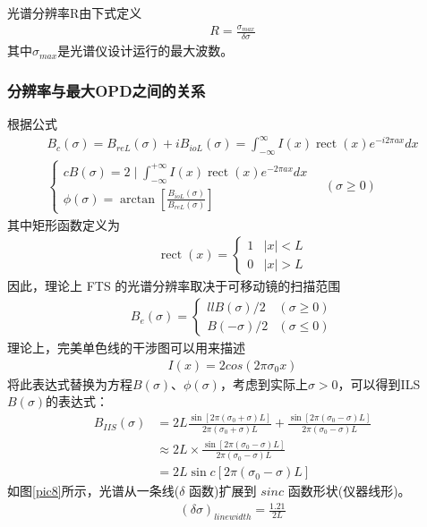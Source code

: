\documentclass[conference]{IEEEtran}
\begin{document}
光谱分辨率R由下式定义
\begin{align}
    R = \frac{\sigma_{max}}{\delta \sigma}
\end{align}
其中$\sigma_{max}$是光谱仪设计运行的最大波数。

\subsubsection{分辨率与最大OPD之间的关系}
根据公式
\begin{align}
    B_{c}(\sigma)=B_{r e L}(\sigma)+i B_{i o L}(\sigma)=\int_{-\infty}^{\infty} I(x) \operatorname{rect}(x) e^{-i 2 \pi a x} d x \\
    \begin{cases}{c}
        B(\sigma)=2 \mid \int_{-\infty}^{+\infty} I(x) \operatorname{rect}(x) e^{-2 \pi a x} d x \\
        \phi(\sigma)=\arctan \left[\frac{B_{i o L}(\sigma)}{B_{r e L}(\sigma)}\right]
    \end{cases} \quad(\sigma \geq 0)
\end{align}
其中矩形函数定义为
\begin{align*}
    \operatorname{rect}(x)=\begin{cases}
        1 & |x|<L \\
        0 & |x|>L
        \end{cases}
\end{align*}
因此，理论上 FTS 的光谱分辨率取决于可移动镜的扫描范围
\begin{align}
    B_{e}(\sigma)=\begin{cases}{ll}
        B(\sigma) / 2 & (\sigma \geq 0) \\
        B(-\sigma) / 2 & (\sigma \leq 0)
        \end{cases}
\end{align}
理论上，完美单色线的干涉图可以用来描述
\begin{align}
    I(x) = 2cos(2\pi \sigma_0 x)
\end{align}
将此表达式替换为方程$B(\sigma)$、$\phi(\sigma)$，考虑到实际上$\sigma > 0$，可以得到ILS $B(\sigma)$的表达式：
\begin{align}
        B_{I I S}(\sigma)
        &=2 L\frac{\sin \left[2 \pi\left(\sigma_{0}+\sigma\right) L\right]}{2 \pi\left(\sigma_{0}+\sigma\right) L}+\frac{\sin \left[2 \pi\left(\sigma_{0}-\sigma\right) L\right]}{2 \pi\left(\sigma_{0}-\sigma\right) L} \\
        & \approx 2 L \times \frac{\sin \left[2 \pi\left(\sigma_{0}-\sigma\right) L\right]}{2 \pi\left(\sigma_{0}-\sigma\right) L}  \\
        & =2 L \sin c\left[2 \pi\left(\sigma_{0}-\sigma\right) L\right]
\end{align}
如图\ref{pic8}所示，光谱从一条线($\delta$ 函数)扩展到 $sin c$ 函数形状(仪器线形)。
\begin{align}
    (\delta \sigma)_{linewidth} = \frac{1.21}{2L}
\end{align}
\end{document}
